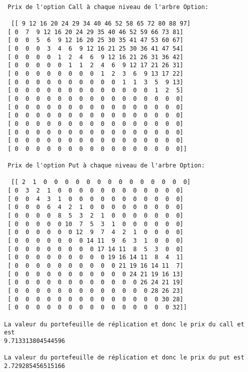 \documentclass[11pt]{article}
\begin{document}
    \begin{Verbatim}[commandchars=\\\{\}]

 Prix de l'option Call à chaque niveau de l'arbre Option:

  [[ 9 12 16 20 24 29 34 40 46 52 58 65 72 80 88 97]
 [ 0  7  9 12 16 20 24 29 35 40 46 52 59 66 73 81]
 [ 0  0  5  6  9 12 16 20 25 30 35 41 47 53 60 67]
 [ 0  0  0  3  4  6  9 12 16 21 25 30 36 41 47 54]
 [ 0  0  0  0  1  2  4  6  9 12 16 21 26 31 36 42]
 [ 0  0  0  0  0  1  1  2  4  6  9 12 17 21 26 31]
 [ 0  0  0  0  0  0  0  0  1  2  3  6  9 13 17 22]
 [ 0  0  0  0  0  0  0  0  0  0  1  1  3  5  9 13]
 [ 0  0  0  0  0  0  0  0  0  0  0  0  0  1  2  5]
 [ 0  0  0  0  0  0  0  0  0  0  0  0  0  0  0  0]
 [ 0  0  0  0  0  0  0  0  0  0  0  0  0  0  0  0]
 [ 0  0  0  0  0  0  0  0  0  0  0  0  0  0  0  0]
 [ 0  0  0  0  0  0  0  0  0  0  0  0  0  0  0  0]
 [ 0  0  0  0  0  0  0  0  0  0  0  0  0  0  0  0]
 [ 0  0  0  0  0  0  0  0  0  0  0  0  0  0  0  0]
 [ 0  0  0  0  0  0  0  0  0  0  0  0  0  0  0  0]]

 Prix de l'option Put à chaque niveau de l'arbre Option:

  [[ 2  1  0  0  0  0  0  0  0  0  0  0  0  0  0  0]
 [ 0  3  2  1  0  0  0  0  0  0  0  0  0  0  0  0]
 [ 0  0  4  3  1  0  0  0  0  0  0  0  0  0  0  0]
 [ 0  0  0  6  4  2  1  0  0  0  0  0  0  0  0  0]
 [ 0  0  0  0  8  5  3  2  1  0  0  0  0  0  0  0]
 [ 0  0  0  0  0 10  7  5  3  1  0  0  0  0  0  0]
 [ 0  0  0  0  0  0 12  9  7  4  2  1  0  0  0  0]
 [ 0  0  0  0  0  0  0 14 11  9  6  3  1  0  0  0]
 [ 0  0  0  0  0  0  0  0 17 14 11  8  5  3  0  0]
 [ 0  0  0  0  0  0  0  0  0 19 16 14 11  8  4  1]
 [ 0  0  0  0  0  0  0  0  0  0 21 19 16 14 11  7]
 [ 0  0  0  0  0  0  0  0  0  0  0 24 21 19 16 13]
 [ 0  0  0  0  0  0  0  0  0  0  0  0 26 24 21 19]
 [ 0  0  0  0  0  0  0  0  0  0  0  0  0 28 26 23]
 [ 0  0  0  0  0  0  0  0  0  0  0  0  0  0 30 28]
 [ 0  0  0  0  0  0  0  0  0  0  0  0  0  0  0 32]]

La valeur du portefeuille de réplication et donc le prix du call et est
9.713313804544596

La valeur du portefeuille de réplication et donc le prix du put est
2.729285456515166
    \end{Verbatim}
\end{document}

